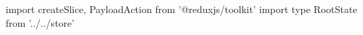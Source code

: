 import {createSlice, PayloadAction} from '@reduxjs/toolkit'
import type { RootState } from '../../store'
